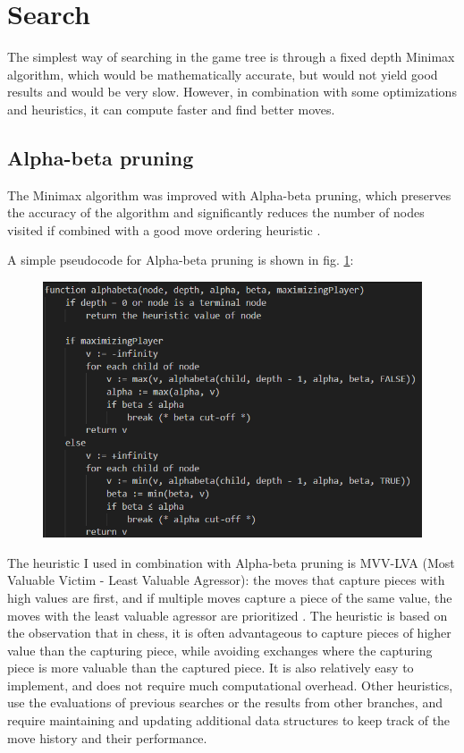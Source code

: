 \section{Search}
\label{sec:ch4sec2}

The simplest way of searching in the game tree is through a fixed depth Minimax algorithm, which would be mathematically accurate, but would not yield good results and would be very slow. However, in combination with some optimizations and heuristics, it can compute faster and find better moves.

\subsection{Alpha-beta pruning}
\label{subsec:ch4sec2subsec1}

The Minimax algorithm was improved with Alpha-beta pruning, which preserves the accuracy of the algorithm and significantly reduces the number of nodes visited if combined with a good move ordering heuristic \cite{eric1992analysis}.

A simple pseudocode for Alpha-beta pruning is shown in fig. \ref{fig:alphabetaPseudocode}:

\begin{figure}[h]
  \centering
  \includegraphics[scale=0.9]{figures/alphabeta-pseudocode.png}
  \label{fig:alphabetaPseudocode}
\end{figure}

The heuristic I used in combination with Alpha-beta pruning is MVV-LVA (Most Valuable Victim - Least Valuable Agressor): the moves that capture pieces with high values are first, and if multiple moves capture a piece of the same value, the moves with the least valuable agressor are prioritized \cite{mvv-lva}. The heuristic is based on the observation that in chess, it is often advantageous to capture pieces of higher value than the capturing piece, while avoiding exchanges where the capturing piece is more valuable than the captured piece. It is also relatively easy to implement, and does not require much computational overhead. Other heuristics, use the evaluations of previous searches or the results from other branches, and require maintaining and updating additional data structures to keep track of the move history and their performance.

